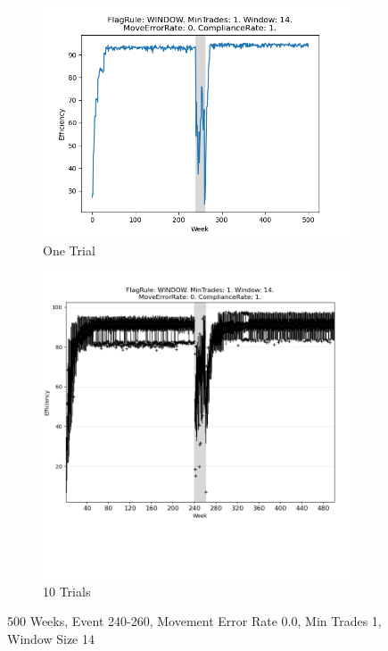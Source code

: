 \documentclass{article}%
\begin{document}
%


\begin{figure}[!htb]%
\begin{subfigure}[b]{0.45\linewidth}%
\includegraphics[width=\linewidth]{2050fr_WINDOW_mt_1_ws_14_er_0_cr_1_t1.png}%
\caption{One Trial}%
\end{subfigure}%
\begin{subfigure}[b]{0.45\linewidth}%
\includegraphics[clip,width=\linewidth,trim=0 4cm 0 0]{2050fr_WINDOW_mt_1_ws_14_er_0_cr_1_t10.png}%
\caption{10 Trials}%
\end{subfigure}%
\caption{500 Weeks, Event 240{-}260, Movement Error Rate 0.0, Min Trades 1, Window Size 14}%
\end{figure}
\end{document}
